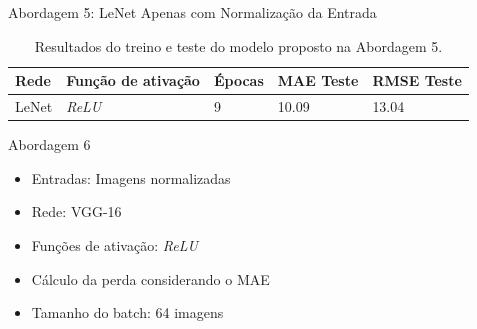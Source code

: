 \begin{frame}{Abordagem 5: LeNet Apenas com Normalização da Entrada}
  \begin{table}[!ht]
		\caption{Resultados do treino e teste do modelo proposto na Abordagem 5.}
		\label{tab:results-1}
		\begin{center}
			\begin{tabular}{l l l l l}
				\toprule
				Rede & Função de ativação & Épocas & MAE Teste & RMSE Teste \\
				\midrule
        LeNet & \emph{ReLU} & 9 &  10.09 & 13.04 \\
				\bottomrule
			\end{tabular}
		\end{center}
	\end{table}
\end{frame}



\begin{frame}{Abordagem 6}
 \begin{itemize}
   \item Entradas: Imagens normalizadas
   \item Rede: \alert{VGG-16}
   \item Funções de ativação: \emph{ReLU}
   \ \ \newline
   \item Cálculo da perda considerando o MAE
   \item \alert{Tamanho do batch: 64 imagens}
   \end{itemize}
\end{frame}

